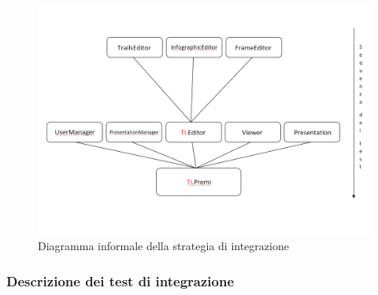 \begin{figure}[h!]
	\centering
	\includegraphics[scale=.45]{img/integrationTests.png}
	\caption{Diagramma informale della strategia di integrazione}
	\label{fig:Diagramma informale della strategia di integrazione}
\end{figure}
\newpage
\subsubsection{Descrizione dei test di integrazione}

